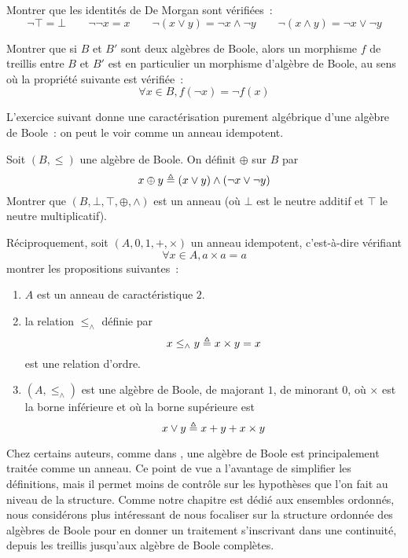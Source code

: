 \begin{exercise}
  Montrer que les identités de De Morgan sont vérifiées~:
  \[\lnot \top = \bot \qquad \lnot\lnot x = x
  \qquad \lnot (x \lor y) = \lnot x \land \lnot y
  \qquad \lnot (x \land y) = \lnot x \lor \lnot y\]
\end{exercise}

\begin{exercise}
  Montrer que si $B$ et $B'$ sont deux algèbres de Boole, alors un morphisme $f$
  de treillis entre $B$ et $B'$ est en particulier un morphisme d'algèbre de
  Boole, au sens où la propriété suivante est vérifiée~:
  \[\forall x \in B, f(\lnot x) = \lnot f(x)\]
\end{exercise}

L'exercice suivant donne une caractérisation purement algébrique d'une algèbre
de Boole~: on peut le voir comme un anneau idempotent.

\begin{exercise}
  Soit $(B,\leq)$ une algèbre de Boole. On définit $\oplus$ sur $B$ par
  \[x\oplus y \triangleq (x\lor y) \land (\lnot x \lor \lnot y)\]
  Montrer que $(B,\bot,\top,\oplus,\land)$ est un anneau (où $\bot$ est le
  neutre additif et $\top$ le neutre multiplicatif).

  Réciproquement, soit $(A,0,1,+,\times)$ un anneau idempotent, c'est-à-dire
  vérifiant
  \[\forall x\in A, a\times a = a\]
  montrer les propositions suivantes~:
  \begin{enumerate}[label=(\roman*)]
  \item $A$ est un anneau de caractéristique $2$.
  \item la relation $\leq_\land$ définie par
    \[x\leq_\land y \triangleq x\times y = x\]
    est une relation d'ordre.
  \item $(A,\leq_\land)$ est une algèbre de Boole, de majorant $1$, de minorant
    $0$, où $\times$ est la borne inférieure et où la borne supérieure est
    \[x\lor y \triangleq x + y + x \times y\]
  \end{enumerate}
\end{exercise}

\begin{remark}
  Chez certains auteurs, comme dans \cite{Halmos1966-HALLOB}, une algèbre de
  Boole est principalement traitée comme un anneau. Ce point de vue a
  l'avantage de simplifier les définitions, mais il permet moins de contrôle
  sur les hypothèses que l'on fait au niveau de la structure. Comme notre
  chapitre est dédié aux ensembles ordonnés, nous considérons plus intéressant
  de nous focaliser sur la structure ordonnée des algèbres de Boole pour en
  donner un traitement s'inscrivant dans une continuité, depuis les treillis
  jusqu'aux algèbre de Boole complètes.
\end{remark}

